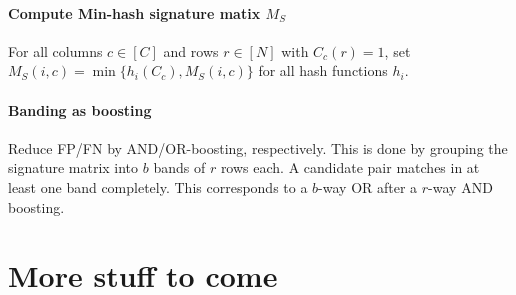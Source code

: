 \documentclass[a4paper, 9pt, DIV=24]{scrartcl}
\begin{document}
\begin{twocolumn}
\paragraph{Compute Min-hash signature matix $M_S$}
For all columns $c \in [C]$ and rows $r \in [N]$ with $C_c(r) = 1$, set $M_S(i,c) = \min\{h_i(C_c), M_S(i,c)\}$ for all hash functions $h_i$.


\paragraph{Banding as boosting} Reduce FP/FN by AND/OR-boosting, respectively. \newline
This is done by grouping the signature matrix into $b$ bands of $r$ rows each.
A candidate pair matches in at least one band completely. This corresponds to a $b$-way OR after a $r$-way AND boosting.

\section{More stuff to come}

\end{twocolumn}

\appendix
\end{document}
